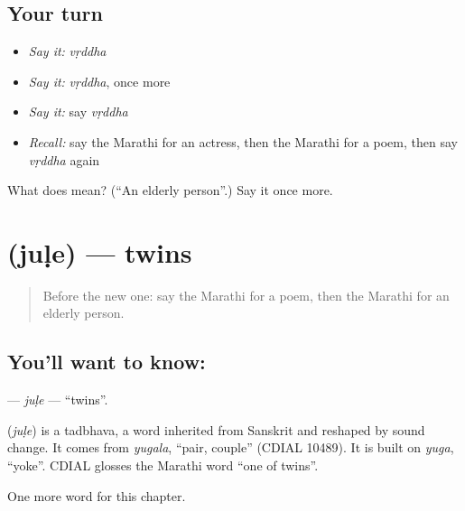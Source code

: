 \subsection*{Your turn}
\begin{itemize}
\raggedright
  \item \emph{Say it:} \emph{vṛddha}
  \item \emph{Say it:} \emph{vṛddha}, once more
  \item \emph{Say it:} say \emph{vṛddha}
  \item \emph{Recall:} say the Marathi for an actress, then the Marathi for a poem, then say \emph{vṛddha} again
\end{itemize}

\begin{tcolorbox}[breakable,colback=teal!4,colframe=teal!35!black,title={Before you move on}]
What does  mean? (\textquotedblleft{}An elderly person\textquotedblright{}.) Say it once more.
\end{tcolorbox}
\section[\texorpdfstring{\mr{जुळे} (juḷe)}{जुळे (juḷe)}]{ (juḷe) — twins}

\label{lesson:MR-C264-jule}



\begin{quote}
Before the new one: say the Marathi for a poem, then the Marathi for an elderly person.
\end{quote}

\subsection*{You'll want to know: }
\textbf{} — \emph{juḷe} — \textquotedblleft{}twins\textquotedblright{}.

\begin{cousinweb}
\textbf{} (\emph{juḷe}) is a tadbhava, a word inherited from Sanskrit and reshaped by sound change. It comes from \emph{yugala}, \textquotedblleft{}pair, couple\textquotedblright{} (CDIAL 10489). It is built on \emph{yuga}, \textquotedblleft{}yoke\textquotedblright{}. CDIAL glosses the Marathi word \textquotedblleft{}one of twins\textquotedblright{}.
\end{cousinweb}

\begin{grammarlens}[title={What you've built}]
One more word for this chapter.
\end{grammarlens}


